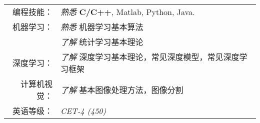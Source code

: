 %
%


 
\renewcommand{\arraystretch}{1.1}

	\begin{tabular}{>{}r>{}p{13cm}} 
		\textsc{编程技能：}     &  \emph{熟悉} \quad \textbf{C/C++}, Matlab, Python, Java.\\  
		\textsc{机器学习：} 	&  \emph{熟悉} \quad  机器学习基本算法 \\
							    &  \emph{了解} \quad  统计学习基本理论 \\
	    \textsc{深度学习：}     &  \emph{了解} \quad 深度学习基本理论，常见深度模型，常见深度学习框架 \\
		\textsc{计算机视觉：}   &  \emph{了解} \quad  基本图像处理方法，图像分割  \\
		\textsc{英语等级：}	    &  \textit{CET-4 (450)}
	\end{tabular}
	
